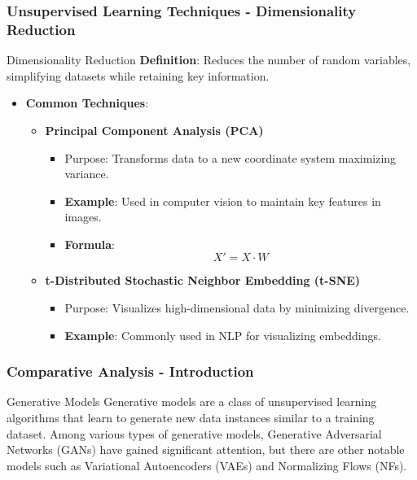 \documentclass[aspectratio=169]{beamer}
\begin{document}
\begin{frame}[fragile]
    \frametitle{Unsupervised Learning Techniques - Dimensionality Reduction}
    \begin{block}{Dimensionality Reduction}
        \textbf{Definition}: Reduces the number of random variables, simplifying datasets while retaining key information.
    \end{block}
    \begin{itemize}
        \item \textbf{Common Techniques}:
        \begin{itemize}
            \item \textbf{Principal Component Analysis (PCA)}
                \begin{itemize}
                    \item Purpose: Transforms data to a new coordinate system maximizing variance.
                    \item \textbf{Example}: Used in computer vision to maintain key features in images.
                    \item \textbf{Formula}:
                    \begin{equation}
                        X' = X \cdot W
                    \end{equation}
                \end{itemize}
            \item \textbf{t-Distributed Stochastic Neighbor Embedding (t-SNE)}
                \begin{itemize}
                    \item Purpose: Visualizes high-dimensional data by minimizing divergence.
                    \item \textbf{Example}: Commonly used in NLP for visualizing embeddings.
                \end{itemize}
        \end{itemize}
    \end{itemize}
\end{frame}

\begin{frame}[fragile]
    \frametitle{Comparative Analysis - Introduction}
    \begin{block}{Generative Models}
        Generative models are a class of unsupervised learning algorithms that learn to generate new data instances similar to a training dataset. Among various types of generative models, Generative Adversarial Networks (GANs) have gained significant attention, but there are other notable models such as Variational Autoencoders (VAEs) and Normalizing Flows (NFs).
    \end{block}
\end{frame}
\end{document}
